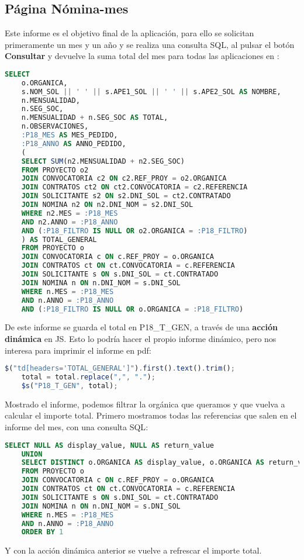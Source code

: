 \subsection{Página Nómina-mes}
Este informe es el objetivo final de la aplicación, para ello se solicitan primeramente un mes y un año y se realiza una consulta \acrshort{SQL}, al pulsar el botón \textbf{Consultar} y devuelve la suma total del mes para todas las aplicaciones en :
\begin{lstlisting}[language=SQL, caption={Consulta informe nómina para un mes determinado}]
	SELECT 
	o.ORGANICA,
	s.NOM_SOL || ' ' || s.APE1_SOL || ' ' || s.APE2_SOL AS NOMBRE,
	n.MENSUALIDAD,
	n.SEG_SOC,
	n.MENSUALIDAD + n.SEG_SOC AS TOTAL,
	n.OBSERVACIONES,
	:P18_MES AS MES_PEDIDO,
	:P18_ANNO AS ANNO_PEDIDO,
	(
	SELECT SUM(n2.MENSUALIDAD + n2.SEG_SOC)
	FROM PROYECTO o2
	JOIN CONVOCATORIA c2 ON c2.REF_PROY = o2.ORGANICA
	JOIN CONTRATOS ct2 ON ct2.CONVOCATORIA = c2.REFERENCIA
	JOIN SOLICITANTE s2 ON s2.DNI_SOL = ct2.CONTRATADO
	JOIN NOMINA n2 ON n2.DNI_NOM = s2.DNI_SOL
	WHERE n2.MES = :P18_MES
	AND n2.ANNO = :P18_ANNO
	AND (:P18_FILTRO IS NULL OR o2.ORGANICA = :P18_FILTRO)
	) AS TOTAL_GENERAL
	FROM PROYECTO o
	JOIN CONVOCATORIA c ON c.REF_PROY = o.ORGANICA
	JOIN CONTRATOS ct ON ct.CONVOCATORIA = c.REFERENCIA
	JOIN SOLICITANTE s ON s.DNI_SOL = ct.CONTRATADO
	JOIN NOMINA n ON n.DNI_NOM = s.DNI_SOL
	WHERE n.MES = :P18_MES
	AND n.ANNO = :P18_ANNO
	AND (:P18_FILTRO IS NULL OR o.ORGANICA = :P18_FILTRO)
\end{lstlisting}

De este informe se guarda el total en P18\_T\_GEN, a través de una \textbf{acción dinámica} en \acrshort{JS}. Esto lo podría hacer el propio informe dinámico, pero nos interesa para imprimir el informe en pdf:
\begin{lstlisting}[language=JavaScript, caption={Guarda y muestra el total del listado}]
	 $("td[headers='TOTAL_GENERAL']").first().text().trim();
	total = total.replace(",", ".");
	$s("P18_T_GEN", total);
\end{lstlisting}

Mostrado el informe, podemos filtrar la orgánica que queramos y que vuelva a calcular el importe total. Primero mostramos todas las referencias que salen en el informe del mes, con una consulta \acrshort{SQL}:
\begin{lstlisting}[language=SQL, caption={Muestra las referencias de proyectos del informe para seleccionar}]
	SELECT NULL AS display_value, NULL AS return_value
	UNION
	SELECT DISTINCT o.ORGANICA AS display_value, o.ORGANICA AS return_value
	FROM PROYECTO o
	JOIN CONVOCATORIA c ON c.REF_PROY = o.ORGANICA
	JOIN CONTRATOS ct ON ct.CONVOCATORIA = c.REFERENCIA
	JOIN SOLICITANTE s ON s.DNI_SOL = ct.CONTRATADO
	JOIN NOMINA n ON n.DNI_NOM = s.DNI_SOL
	WHERE n.MES = :P18_MES
	AND n.ANNO = :P18_ANNO
	ORDER BY 1
\end{lstlisting}
Y con la acción dinámica anterior se vuelve a refrescar el importe total.


